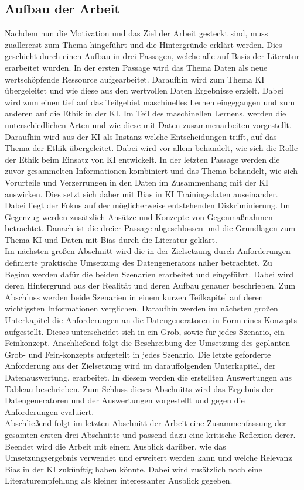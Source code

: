 \begin{onehalfspace}
    \newpage
    \section{Aufbau der Arbeit}
    \label{subsec:aufbau der arbeit}
    Nachdem nun die Motivation und das Ziel der Arbeit gesteckt sind, muss zuallererst zum Thema hingeführt und die Hintergründe erklärt werden. Dies geschieht durch einen Aufbau in drei Passagen, welche alle auf Basis der Literatur erarbeitet wurden. In der ersten Passage wird das Thema Daten als neue wertschöpfende Ressource aufgearbeitet. Daraufhin wird zum Thema \ac*{KI} übergeleitet und wie diese aus den wertvollen Daten Ergebnisse erzielt. Dabei wird zum einen tief auf das Teilgebiet maschinelles Lernen eingegangen und zum anderen auf die Ethik in der \ac*{KI}. Im Teil des maschinellen Lernens, werden die unterschiedlichen Arten und wie diese mit Daten zusammenarbeiten vorgestellt. Daraufhin wird aus der \ac*{KI} als Instanz welche Entscheidungen trifft, auf das Thema der Ethik übergeleitet. Dabei wird vor allem behandelt, wie sich die Rolle der Ethik beim Einsatz von \ac*{KI} entwickelt. In der letzten Passage werden die zuvor gesammelten Informationen kombiniert und das Thema behandelt, wie sich Vorurteile und Verzerrungen in den Daten im Zusammenhang mit der \ac*{KI} auswirken. Dies setzt sich daher mit Bias in \ac*{KI} Trainingsdaten auseinander. Dabei liegt der Fokus auf der möglicherweise entstehenden Diskriminierung. Im Gegenzug werden zusätzlich Ansätze und Konzepte von Gegenmaßnahmen betrachtet. Danach ist die dreier Passage abgeschlossen und die Grundlagen zum Thema \ac*{KI} und Daten mit Bias durch die Literatur geklärt.\\
    Im nächsten großen Abschnitt wird die in der Zielsetzung durch Anforderungen definierte praktische Umsetzung des Datengenerators näher betrachtet. Zu Beginn werden dafür die beiden Szenarien erarbeitet und eingeführt. Dabei wird deren Hintergrund aus der Realität und deren Aufbau genauer beschrieben. Zum Abschluss werden beide Szenarien in einem kurzen Teilkapitel auf deren wichtigsten Informationen verglichen. Daraufhin werden im nächsten großen Unterkapitel die Anforderungen an die Datengeneratoren in Form eines Konzepts aufgestellt. Dieses unterscheidet sich in ein Grob, sowie für jedes Szenario, ein Feinkonzept. Anschließend folgt die Beschreibung der Umsetzung des geplanten Grob- und Fein-konzepts aufgeteilt in jedes Szenario. Die letzte geforderte Anforderung aus der Zielsetzung wird im darauffolgenden Unterkapitel, der Datenauswertung, erarbeitet. In diesem werden die erstellten Auswertungen aus Tableau beschrieben. Zum Schluss dieses Abschnitts wird das Ergebnis der Datengeneratoren und der Auswertungen vorgestellt und gegen die Anforderungen evaluiert.\\
    Abschließend folgt im letzten Abschnitt der Arbeit eine Zusammenfassung der gesamten ersten drei Abschnitte und passend dazu eine kritische Reflexion derer. Beendet wird die Arbeit mit einem Ausblick darüber, wie das Umsetzungsergebnis verwendet und erweitert werden kann und welche Relevanz Bias in der \ac*{KI} zukünftig haben könnte. Dabei wird zusätzlich noch eine Literaturempfehlung als kleiner interessanter Ausblick gegeben.
    \newpage
\end{onehalfspace}